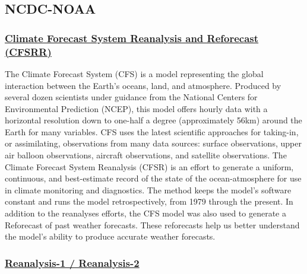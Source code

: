 \documentclass[11pt]{article}
\begin{document}
\subsection{NCDC-NOAA}
\label{sec-3-1}

\subsubsection{\href{http://www.ncdc.noaa.gov/model-data/climate-forecast-system-reanalysis-and-reforecast-cfsrr}{Climate Forecast System Reanalysis and Reforecast (CFSRR)}}
\label{sec-3-1-1}

The Climate Forecast System (CFS) is a model representing the
global interaction between the Earth's oceans, land, and
atmosphere. Produced by several dozen scientists under guidance
from the National Centers for Environmental Prediction (NCEP),
this model offers hourly data with a horizontal resolution down to
one-half a degree (approximately 56km) around the Earth for many
variables. CFS uses the latest scientific approaches for
taking-in, or assimilating, observations from many data sources:
surface observations, upper air balloon observations, aircraft
observations, and satellite observations. The Climate Forecast
System Reanalysis (CFSR) is an effort to generate a uniform,
continuous, and best-estimate record of the state of the
ocean-atmosphere for use in climate monitoring and
diagnostics. The method keeps the model’s software constant and
runs the model retrospectively, from 1979 through the present. In
addition to the reanalyses efforts, the CFS model was also used to
generate a Reforecast of past weather forecasts. These reforecasts
help us better understand the model's ability to produce accurate
weather forecasts.
\subsubsection{\href{http://www.ncdc.noaa.gov/model-data/reanalysis-1-reanalysis-2}{Reanalysis-1 / Reanalysis-2}}
\label{sec-3-1-2}
\end{document}
